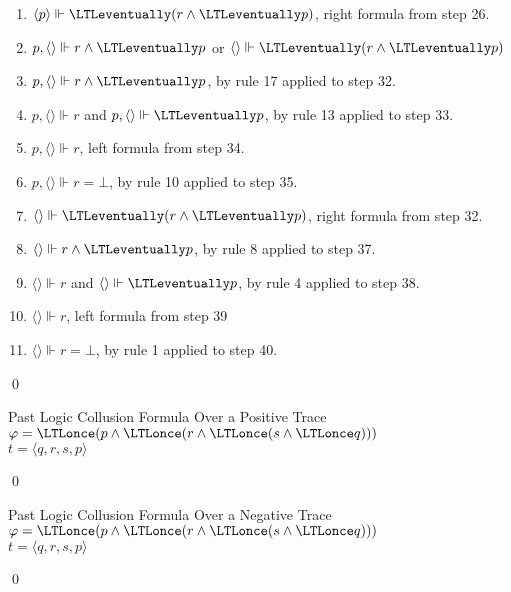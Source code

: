 \begin{myEx}
\begin{enumerate}
\item $\langle p \rangle \Vdash \LTLeventually(r \land \LTLeventually p)$, right formula from step 26.\\ %

\item $p, \langle \rangle \Vdash r \land \LTLeventually p$ or $\langle \rangle \Vdash \LTLeventually(r \land \LTLeventually p)$\\ %

\item $p, \langle \rangle \Vdash r \land \LTLeventually p$, by rule 17 applied to step 32.\\ %

\item $p, \langle \rangle \Vdash r$ and $p, \langle \rangle \Vdash \LTLeventually p$, by rule 13 applied to step 33.\\ %

\item $p, \langle \rangle \Vdash r$, left formula from step 34.\\ %

\item $p, \langle \rangle \Vdash r = \bot$, by rule 10 applied to step 35.\\ %

\item $\langle \rangle \Vdash \LTLeventually(r \land \LTLeventually p)$, right formula from step 32.\\ %

\item $\langle \rangle \Vdash r \land \LTLeventually p$, by rule 8 applied to step 37.\\ %
 
\item $\langle \rangle \Vdash r$ and $\langle \rangle \Vdash \LTLeventually p$, by rule 4 applied to step 38.\\ %

\item $\langle \rangle \Vdash r$, left formula from step 39\\ %

\item $\langle \rangle \Vdash r = \bot$, by rule 1 applied to step 40.\\%
\end{enumerate}
\qed
\end{myEx}

\begin{myEx} Past Logic Collusion Formula Over a Positive Trace\\

\noindent
$\varphi = \LTLonce(p \land \LTLonce(r \land \LTLonce(s \land \LTLonce q)))$\\
$t = \langle q, r, s, p \rangle$

\qed
\end{myEx}

\begin{myEx} Past Logic Collusion Formula Over a Negative Trace\\

\noindent
$\varphi = \LTLonce(p \land \LTLonce(r \land \LTLonce(s \land \LTLonce q)))$\\
$t = \langle q, r, s, p \rangle$

\qed
\end{myEx}

